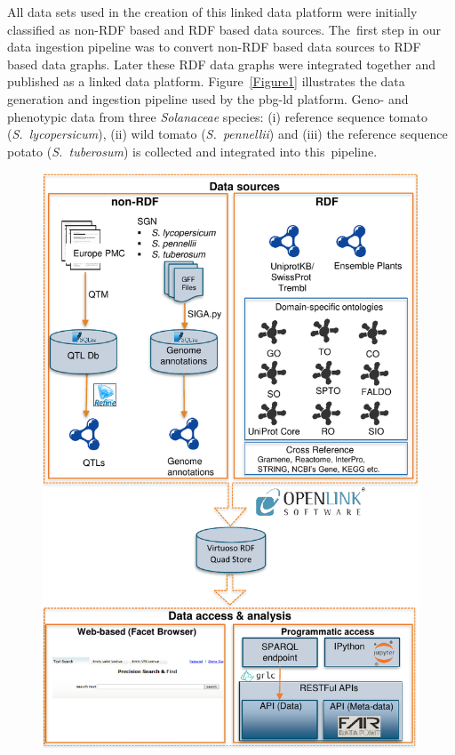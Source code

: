 \documentclass[applsci,article,accept,moreauthors,pdftex]{Definitions/mdpi}
\begin{document}
{{{All data sets used in the creation of this linked data platform were initially classified as non-RDF based and RDF based data sources. The~first step in our data ingestion pipeline was to convert non-RDF based data sources to RDF based data graphs. Later these RDF data graphs were integrated together and published as a linked data platform.}} Figure~\ref{Figure1} illustrates the data generation and ingestion pipeline used by the pbg-ld platform.
Geno- and phenotypic data %
from three \textit{Solanaceae} species: %
(i) reference sequence tomato (\textit{S.~lycopersicum}), (ii) wild tomato (\textit{S.~pennellii}) and (iii) the reference sequence potato (\textit{S.~tuberosum}) is collected and integrated into this~pipeline.

\begin{figure}[H]
\centering
\includegraphics[scale=.9]{Figure1.pdf}

\end{figure}}
\end{document}
